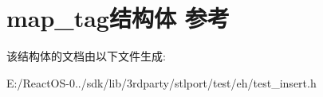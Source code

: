 \hypertarget{structmap__tag}{}\section{map\+\_\+tag结构体 参考}
\label{structmap__tag}


该结构体的文档由以下文件生成\+:\begin{DoxyCompactItemize}
\item 
E\+:/\+React\+O\+S-\/0../sdk/lib/3rdparty/stlport/test/eh/test\+\_\+insert.\+h\end{DoxyCompactItemize}
